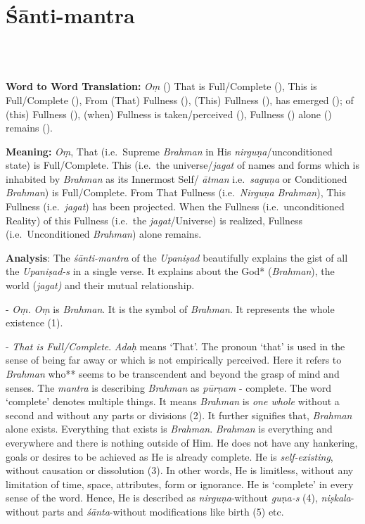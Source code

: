 \chapter[\textit{Śānti-mantra}]{Śānti-mantra}

\begin{moolashloka}
\\
\\
\end{moolashloka}
\vskip -10pt

\textbf{Word to Word Translation:} \emph{Oṃ} () That is Full/Complete (), This is Full/Complete (), From (That) Fullness (), (This) Fullness (), has emerged (); of (this) Fullness (), (when) Fullness is taken/perceived (), Fullness () alone () remains ().

\textbf{Meaning:} \emph{Oṃ}, That (i.e.\ Supreme \emph{Brahman} in His \emph{nirguṇa}/un\-condi\-tioned state) is Full/Complete. This (i.e.\ the universe/\emph{jagat} of names and forms which is inhabited by \emph{Brahman} as its Innermost Self/ \emph{ātman} i.e.\ \emph{saguṇa} or Conditioned \emph{Brahman}) is Full/Complete. From That Fullness (i.e.\ \emph{Nirguṇa} \emph{Brahman}), This Fullness (i.e.\ \emph{jagat}) has been projected. When the Fullness (i.e.\ unconditioned Reality) of this Fullness (i.e.\ the \emph{jagat}/Universe) is realized, Fullness (i.e.\ Unconditioned \emph{Brahman}) alone remains.

\textbf{Analysis}: The \emph{śānti-mantra} of the \emph{Upaniṣad} beautifully explains the gist of all the \emph{Upaniṣad-s} in a single verse. It explains about the God* (\emph{Brahman}), the world (\emph{jagat)} and their mutual relationship.

- \emph{Oṃ.} \emph{Oṃ} is \emph{Brahman}. It is the symbol of \emph{Brahman}. It represents the whole existence (1).

- \emph{That is Full/Complete}. \emph{Adaḥ} means `That'. The pronoun `that' is used in the sense of being far away or which is not empirically perceived. Here it refers to \emph{Brahman} who** seems to be transcendent and beyond the grasp of mind and senses. The \emph{mantra} is describing \emph{Brahman} as \emph{pūrṇam} - complete. The word `complete' denotes multiple things. It means \emph{Brahman} is \emph{one whole} without a second and without any parts or divisions (2). It further signifies that, \emph{Brahman} alone exists. Everything that exists is \emph{Brahman}. \emph{Brahman} is everything and everywhere and there is nothing outside of Him. He does not have any hankering, goals or desires to be achieved as He is already complete. He is \emph{self-existing}, without causation or dissolution (3). In other words, He is limitless, without any limitation of time, space, attributes, form or ignorance. He is `complete' in every sense of the word. Hence, He is described as \emph{nirguṇa}-without \emph{guṇa-s} (4), \emph{niṣkala}-without parts and \emph{śānta}-without modifications like birth (5) etc.

